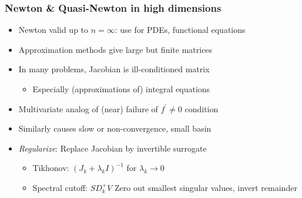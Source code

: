\documentclass[bigger]{beamer}
\begin{document}
\begin{frame}%
\frametitle{Newton \& Quasi-Newton in high dimensions}
\begin{itemize}

\item Newton valid up to $n=\infty$: use for PDEs, functional equations
\item Approximation methods give large but finite matrices
\item In many problems, Jacobian is ill-conditioned matrix
\begin{itemize}
\item Especially (approximations of) integral equations
\end{itemize}
\item Multivariate analog of (near) failure of $f^{\prime}\neq 0$ condition
\item Similarly causes slow or non-convergence, small basin
\item \emph{Regularize}: Replace Jacobian by invertible surrogate
\begin{itemize}
\item Tikhonov: $(J_k+\lambda_k I)^{-1}$ for $\lambda_k\to 0$
\item Spectral cutoff: $SD_k^{+}V$ Zero out smallest singular values, invert remainder
\end{itemize}

\end{itemize}
\end{frame}%
\end{document}
